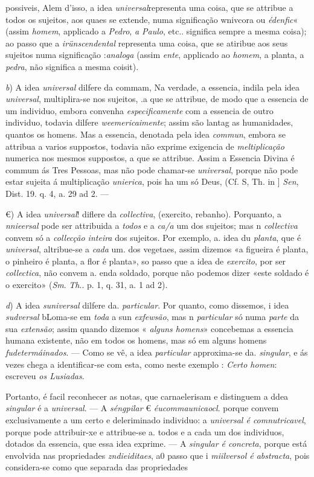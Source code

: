 possiveis, Alem d'isso, a idea \emph{universal}representa uma coisa, que se attribue a todos os sujeitos, aos quaes se extende, numa significação wnivcora ou \emph{édenfic}« (assim \emph{homem}, applicado a \emph{Pedro}, \emph{a Paulo}, etc.. significa sempre a mesma coisa); ao passo que a \emph{irünscendental} representa uma coisa, que se atiribue aos seus sujeitos numa significação :\emph{analoga} (assim \emph{ente}, applicado ao \emph{homem}, a planta, a \emph{pedra}, não significa a mesma coisit).\par \emph{b}) A idea \emph{universal} dilfere da commam, Na verdade, a essencia, indila pela idea \emph{universal}, multiplira-se nos sujeitos, .a que se attribue, de modo que a essencia de um individuo, embora convenha \emph{especificamente} com a essencia de outro individuo, todavia dilfere \emph{weemericaimente}; assim são lantag as humanidades, quantos os homens. Mas a essencia, denotada pela idea \emph{commun}, embora se attribua a varios suppostos, todavia não exprime exigencia de \emph{meltiplicação} numerica nos mesmos suppostos, a que se attribue. Assim a Essencia Divina é commum ás Tres Pessoas, mas não pode chamar-se \emph{universal}, porque não pode estar sujeita á multiplicação \emph{unierica}, pois ha um só Deus, (Cf. S, Th. in ] \emph{Sen}, Dist. 19. q. 4, a. 29 ad 2. ---\par €) A idea \emph{universal}! diflere da \emph{collectiva}, (exercito, rebanho). Porquanto, a \emph{nnieersal} pode ser attribuida a \emph{todos} e a \emph{ca/a} um dos sujeitos; mas n \emph{collectiva} convem só a \emph{collecção inteira} dos sujeitos. Por exemplo, a. idea du \emph{planta}, que é \emph{universal}, altribue-se a \emph{cada} um. dos vegetaes, assim dizemos «a figueira é planta, o pinheiro é planta, a flor é planta», so passo que a idea de \emph{exercito}, por ser \emph{collectica}, não convem a. enda soldado, porque não podemos dizer «este soldado é o exercito» (\emph{Sm}. \emph{Th}.. p. 1, q. 31, a. 1 ad 2).\par \emph{d}) A idea \emph{suniversal} dilfere da. \emph{particular}. Por quanto, como dissemos, i idea \emph{sudversal} bLoma-se em \emph{toda} a sun \emph{exfewsão}, mas n \emph{particular} só numa \emph{parte} da sua \emph{extensão}; assim quando dizemos « \emph{alguns homens}» concebemas a essencia humana existente, não em todos os homens, mas só em alguns homens \emph{fudetermáinados}. --- Como se vê, a idea \emph{particular} approxima-se da. \emph{singular}, e ás vezes chega a identificar-se com esta, como neste exemplo : \emph{Certo homen}: escreveu \emph{os Lusiadas}.\par Portanto, é facil reconhecer as notas, que carnaelerisam e distinguem a ddea \emph{singular} é a \emph{universal}. --- A \emph{séngpilar} € \emph{éucommaunicaocl}. porque convem exclusivamente a um certo e deleriminado individuo: a \emph{universal é comnutricavel}, porque pode attribuir-xe e attribue-se a. todos e a cada um dos individuos, dotados da essencia, que essa idea exprime. --- A \emph{singular é concreta}, porque está envolvida nas propriedades \emph{zndieiditaes}, a0 passo que i \emph{miilversol é abstracta}, pois considera-se como que separada das propriedades 